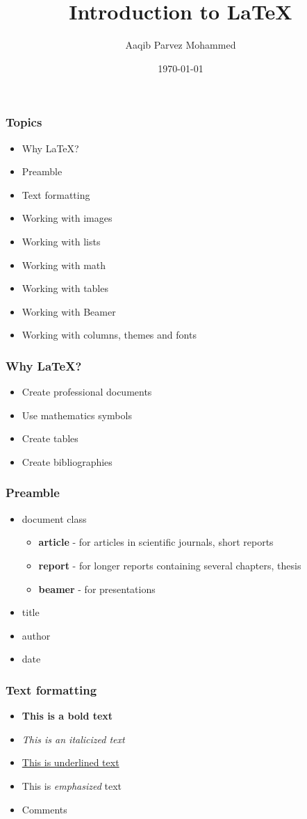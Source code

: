 \documentclass{beamer}
\title{Introduction to LaTeX}
\author{Aaqib Parvez Mohammed}
\date{\today}
\begin{document}
\maketitle
\begin{frame}
\frametitle{Topics}
\begin{itemize}
\item Why LaTeX?
\item Preamble
\item Text formatting
\item Working with images
\item Working with lists
\item Working with math
\item Working with tables
\item Working with Beamer
\item Working with columns, themes and fonts
\end{itemize}
\end{frame}
\begin{frame}
\frametitle{Why LaTeX?}
\begin{itemize}
\item Create professional documents
\item Use mathematics symbols
\item Create tables
\item Create bibliographies
\end{itemize}
\end{frame}
\begin{frame}
\frametitle{Preamble}
\begin{itemize}
\item document class
\begin{itemize}
\item \textbf{article} - for articles in scientific journals, short reports
\item \textbf{report} - for longer reports containing several chapters, thesis
\item \textbf{beamer} - for presentations
\end{itemize}
\item title
\item author
\item date
\end{itemize}
\end{frame}
\begin{frame}
\frametitle{Text formatting}
\begin{itemize}
\item \textbf{This is a bold text}
\item \textit{This is an italicized text}
\item \underline{This is underlined text}
\item This is \emph{emphasized} text
\item Comments
\end{itemize}
\end{frame}
\end{document}
